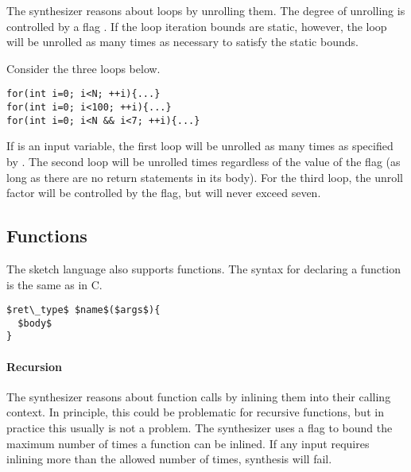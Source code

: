 The synthesizer reasons about loops by unrolling them. The degree of unrolling is controlled by a flag . If the loop iteration bounds are static, however, the loop will be unrolled as many times as necessary to satisfy the static bounds.



\begin{Example}
Consider the three loops below.
\begin{lstlisting}
for(int i=0; i<N; ++i){...}
for(int i=0; i<100; ++i){...}
for(int i=0; i<N && i<7; ++i){...}
\end{lstlisting}
If  is an input variable, the first loop will be unrolled as many times as specified by . The second loop will be unrolled  times regardless of the value of the flag (as long as there are no return statements in its body). For the third loop, the unroll factor will be controlled by the flag, but will never exceed seven.
\end{Example}



\subsection{Functions}
The sketch language also supports functions. The syntax for declaring a function is the same as in C.

\begin{lstlisting}
$ret\_type$ $name$($args$){
  $body$
}
\end{lstlisting}

\paragraph{Recursion}
The synthesizer reasons about function calls by inlining them into their calling context. In principle, this could be problematic for recursive functions, but in practice this usually is not a problem. The synthesizer uses a flag  to bound the maximum number of times a function can be inlined. If any input requires inlining more than the allowed number of times, synthesis will fail.


